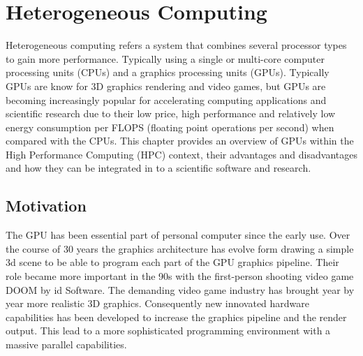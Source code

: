 

\chapter{Heterogeneous Computing} %

\label{Heterogeneous Computing} %



Heterogeneous computing refers a system that combines several processor types to gain more performance. Typically using a single or multi-core computer processing units (CPUs) and a  graphics processing units (GPUs).
Typically GPUs are know for  3D graphics rendering and video games, but GPUs are becoming increasingly popular for accelerating computing applications and scientific research due to their low price, high performance and relatively low energy consumption per FLOPS (floating point operations per second) when compared with the CPUs. This chapter provides an overview of GPUs within the High Performance Computing (HPC) context, their advantages and disadvantages and how they can be integrated in to a scientific software and research.



\section{Motivation}


The GPU has been essential part of personal computer since the early use. Over the course of 30 years the graphics architecture has evolve form drawing a simple 3d scene to be able to program each part of the GPU graphics pipeline. Their role became more important in the 90s with the first-person shooting video game DOOM by id Software. The demanding video game industry has brought year by year more realistic 3D graphics. Consequently new innovated hardware capabilities has been developed to increase the graphics pipeline and the render output. This lead to a more sophisticated programming environment with a massive parallel capabilities.

